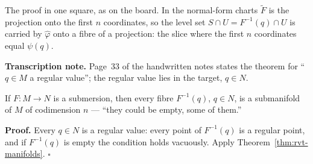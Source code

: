 \documentclass[11pt]{report}
\makeatletter
\newcounter{thmcounter}[section]
\renewenvironment{proof}[1][Proof]{\noindent\textbf{#1.} }{\hfill$\square$\par\vspace{5pt}}
\newcommand{\thmlabel}[1]{\edef\@currentlabel{\arabic{section}.\arabic{thmcounter}}\label{#1}}
\makeatother
\begin{document}
The proof in one square, as on the board. In the normal-form charts $\tilde F$ is the projection onto the first $n$ coordinates, so the level set $S \cap U = F^{-1}(q) \cap U$ is carried by $\hat\varphi$ onto a fibre of a projection: the slice where the first $n$ coordinates equal $\psi(q)$.

\textbf{Transcription note.} Page~33 of the handwritten notes states the theorem for ``$q \in M$ a regular value''; the regular value lies in the target, $q \in N$.

\begin{corbox}\thmlabel{cor:submersion-fibres}
If $F : M \to N$ is a submersion, then every fibre $F^{-1}(q)$, $q \in N$, is a submanifold of $M$ of codimension $n$ --- ``they could be empty, some of them.''
\end{corbox}

\begin{proof}
Every $q \in N$ is a regular value: every point of $F^{-1}(q)$ is a regular point, and if $F^{-1}(q)$ is empty the condition holds vacuously. Apply Theorem~\ref{thm:rvt-manifolds}.
\end{proof}
\end{document}
